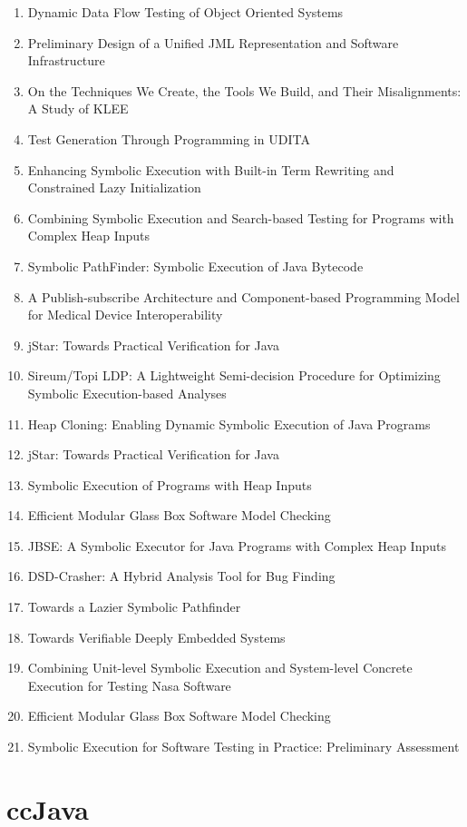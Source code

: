 \begin{enumerate}
\item Dynamic Data Flow Testing of Object Oriented Systems
\item Preliminary Design of a Unified JML Representation and Software Infrastructure
\item On the Techniques We Create, the Tools We Build, and Their Misalignments: A Study of KLEE
\item Test Generation Through Programming in UDITA
\item Enhancing Symbolic Execution with Built-in Term Rewriting and Constrained Lazy Initialization
\item Combining Symbolic Execution and Search-based Testing for Programs with Complex Heap Inputs
\item Symbolic PathFinder: Symbolic Execution of Java Bytecode
\item A Publish-subscribe Architecture and Component-based Programming Model for Medical Device Interoperability
\item jStar: Towards Practical Verification for Java
\item Sireum/Topi LDP: A Lightweight Semi-decision Procedure for Optimizing Symbolic Execution-based Analyses
\item Heap Cloning: Enabling Dynamic Symbolic Execution of Java Programs
\item jStar: Towards Practical Verification for Java
\item Symbolic Execution of Programs with Heap Inputs
\item Efficient Modular Glass Box Software Model Checking
\item JBSE: A Symbolic Executor for Java Programs with Complex Heap Inputs
\item DSD-Crasher: A Hybrid Analysis Tool for Bug Finding
\item Towards a Lazier Symbolic Pathfinder
\item Towards Verifiable Deeply Embedded Systems
\item Combining Unit-level Symbolic Execution and System-level Concrete Execution for Testing Nasa Software
\item Efficient Modular Glass Box Software Model Checking
\item Symbolic Execution for Software Testing in Practice: Preliminary Assessment
\end{enumerate}

\section{ccJava}

